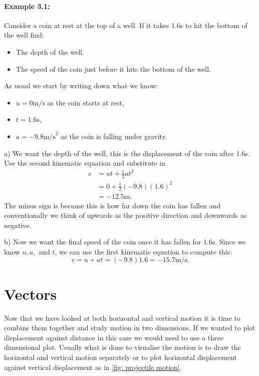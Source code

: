 \paragraph{Example 3.1:} Consider a coin at rest at the top of a well. If it takes 1.6s to hit the bottom of the well find:
\begin{itemize}
\setlength{\itemsep}{-5pt}
    \item[a)] The depth of the well.
    \item[b)] The speed of the coin just before it hits the bottom of the well.
\end{itemize}

As usual we start by writing down what we know:
\begin{itemize}
\setlength{\itemsep}{-5pt}
    \item $u=0\text{m/s}$ as the coin starts at rest,
    \item $t=1.6\text{s}$,
    \item $a=-9.8\text{m/s}^{2}$ as the coin is falling under gravity.
\end{itemize}

a) We want the depth of the well, this is the displacement of the coin after 1.6s. Use the second kinematic equation and substitute in 
\begin{align*}
    s   &=ut+\frac{1}{2}a t^{2}\\
        &=0 +\frac{1}{2}(-9.8)(1.6)^{2}\\
        &=-12.5\text{m}.
\end{align*}
The minus sign is because this is how far down the coin has fallen and conventionally we think of upwards as the positive direction and downwards as negative.

b) Now we want the final speed of the coin once it has fallen for $1.6$s. Since we know $u,a,$ and $t$, we can use the first kinematic equation to compute this:
\begin{equation*}
    v=u+at =(-9.8)1.6=-15.7\text{m/s}.
\end{equation*}

\section{Vectors}
Now that we have looked at both horizontal and vertical motion it is time to combine them together and study motion in two dimensions. If we wanted to plot displacement against distance in this case we would need to use a three dimensional plot. Usually what is done to visualise the motion is to draw the horizontal and vertical motion separately or to plot horizontal displacement against vertical displacement as in \cref{fig: projectile motion}.\\

